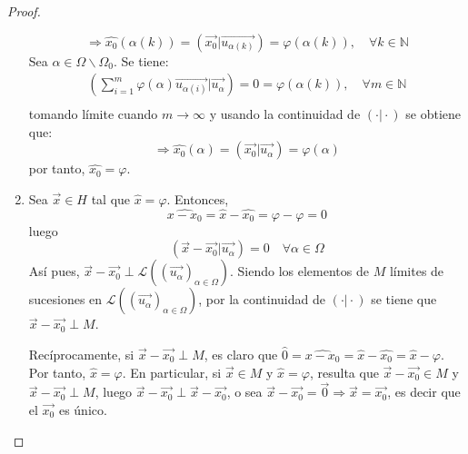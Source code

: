 \documentclass[12pt]{report}
\theoremstyle{largebreak}
\newcommand\pint[2]{\ensuremath{\left(#1\big| #2\right)}}
\begin{document}
\begin{proof}
\begin{enumerate}
            \begin{equation*}
                \Rightarrow \hat{x_0}(\alpha(k))=\pint{\vec{x_0}}{\vec{u_{\alpha(k)}}}=\varphi(\alpha(k)),\quad\forall k\in\mathbb{N}
            \end{equation*}
            Sea $\alpha\in\Omega\backslash\Omega_0$. Se tiene:
            \begin{equation*}
                \begin{split}
                    \pint{\sum_{i=1 }^{m}\varphi(\alpha)\vec{u_{\alpha(i)}}}{\vec{u_{\alpha}}}=0=\varphi(\alpha(k)),\quad\forall m\in\mathbb{N} \\
                \end{split}
            \end{equation*}
            tomando límite cuando $m\rightarrow\infty$ y usando la continuidad de $\pint{\cdot}{\cdot}$ se obtiene que:
            \begin{equation*}
                \Rightarrow \hat{x_0}(\alpha)=\pint{\vec{x_0}}{\vec{u_{\alpha}}}=\varphi(\alpha)
            \end{equation*}
            por tanto, $\hat{x_0}=\varphi$.

            \item Sea $\vec{x}\in H$ tal que $\hat{x}=\varphi$. Entonces,
            \begin{equation*}
                \widehat{x-x_0}=\hat{x}-\hat{x_0}=\varphi-\varphi=0
            \end{equation*}
            luego
            \begin{equation*}
                \pint{\vec{x}-\vec{x_0}}{\vec{u_\alpha}}=0\quad\forall\alpha\in\Omega
            \end{equation*}
            Así pues, $\vec{x}-\vec{x_0}\perp\mathcal{L}((\vec{u_\alpha})_{\alpha\in\Omega})$. Siendo los elementos de $M$ límites de sucesiones en $\mathcal{L}((\vec{u_\alpha})_{\alpha\in\Omega})$, por la continuidad de $\pint{\cdot}{\cdot}$ se tiene que $\vec{x}-\vec{x_0}\perp M$.

            Recíprocamente, si $\vec{x}-\vec{x_0}\perp M$, es claro que $\hat{0}=\widehat{x-x_0}=\hat{x}-\hat{x_0}=\hat{x}-\varphi$. Por tanto, $\hat{x}=\varphi$. En particular, si $\vec{x}\in M$ y $\hat{x}=\varphi$, resulta que $\vec{x}-\vec{x_0}\in M$ y $\vec{x}-\vec{x_0}\perp M$, luego $\vec{x}-\vec{x_0}\perp\vec{x}-\vec{x_0}$, o sea $\vec{x}-\vec{x_0}=\vec{0}\Rightarrow \vec{x}=\vec{x_0}$, es decir que el $\vec{x_0}$ es único.
        \end{enumerate}
    \end{proof}
 
\end{document}
